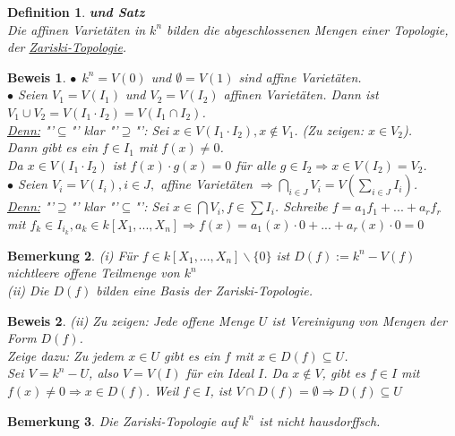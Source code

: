 \documentclass[a4paper,12pt]{report}
\theoremstyle{break}
\newtheorem{Def}{Definition}[chapter]
\newtheorem{Bem}[Def]{Bemerkung}
\theoremstyle{nonumberbreak}
\newtheorem{Bew}{Beweis}
\theoremstyle{nonumberplain}
\begin{document}
\begin{Def} {\textbf{und Satz}}\\
Die affinen Varietäten in $k^n$ bilden die abgeschlossenen Mengen einer Topologie, der \underline{Zariski-Topologie}.
\end{Def}
\begin{Bew}
$\bullet~~ k^n=V(0)$ und $\emptyset = V(1)$ sind affine Varietäten.\\
$\bullet$ Seien $V_1=V(I_1)$ und $V_2=V(I_2)$ affinen Varietäten. Dann ist $V_1\cup V_2=V(I_1\cdot I_2)=V(I_1\cap I_2)$.\\
\underline{Denn:} "'$\subseteq$"' klar "'$\supseteq$"': Sei $x\in V(I_1\cdot I_2), x\notin V_1$. (Zu zeigen: $x\in V_2$).\\
Dann gibt es ein $f\in I_1$ mit $f(x) \neq 0$.\\
Da $x\in V(I_1\cdot I_2)$ ist $f(x)\cdot g(x)=0$ für alle $g\in I_2 \Rightarrow x\in V(I_2) = V_2$.\\
$\bullet$ Seien $V_i = V(I_i), i\in J,$ affine Varietäten $\Rightarrow \bigcap_{i\in J}V_i = V(\sum_{i\in J}I_i)$.\\
\underline{Denn:} "'$\supseteq$"' klar "'$\subseteq$"': Sei $x\in\bigcap V_i, f\in \sum I_i$. Schreibe $f=a_1f_1+...+a_rf_r$ mit $f_k\in I_{i_k}, a_k \in k[X_1,...,X_n] \Rightarrow f(x)=a_1(x) \cdot 0 +...+ a_r(x)\cdot 0 = 0$
\end{Bew}
\begin{Bem}
(i) Für $f\in k[X_1,...,X_n]\backslash \{0\}$ ist $D(f):= k^n-V(f)$ nichtleere offene Teilmenge von $k^n$\\ 
(ii) Die $D(f)$ bilden eine Basis der Zariski-Topologie. 
\end{Bem}
\begin{Bew}
(ii) Zu zeigen: Jede offene Menge $U$ ist Vereinigung von Mengen der Form $D(f)$.\\
Zeige dazu: Zu jedem  $x\in U$ gibt es ein $f$ mit $x\in D(f)\subseteq U$.\\
Sei $V=k^n-U$, also $V=V(I)$ für ein Ideal $I$. Da $x\notin V$, gibt es $f\in I$
mit $f(x)\neq 0 \Rightarrow x\in D(f)$. Weil $f\in I$, ist $V\cap D(f) = \emptyset \Rightarrow D(f) \subseteq U$
\end{Bew}
\begin{Bem}
Die Zariski-Topologie auf $k^n$ ist nicht hausdorffsch.
\end{Bem}
\end{document}

